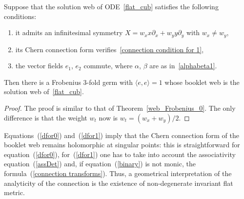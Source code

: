 \documentclass[pdftex]{sigma}
\begin{document}
\begin{theorem}\label{web_Frobenius_1}
Suppose that the solution web of ODE~\eqref{flat_cub} satisfies the following conditions:
\begin{enumerate}\itemsep=0pt
\item[$1)$] it admits an infinitesimal symmetry $X=w_xx\partial_x+w_yy\partial_y$ with $w_x\ne w_y$,
\item[$2)$] its Chern connection form verifies~\eqref{connection condition for 1},
\item[$3)$] the vector fields $e_1$, $e_2$ commute, where $\alpha$, $\beta$ are as in~\eqref{alphabeta1}.
\end{enumerate}
Then there is a Frobenius $3$-fold germ with $\langle e,e\rangle =1$ whose booklet web is the solution web of~\eqref{flat_cub}.
\end{theorem}
\begin{proof} The proof is similar to that of Theorem~\ref{web_Frobenius_0}.
The only dif\/ference is that the weight $w_t$ now is $w_t=(w_x+w_y)/2$.
\end{proof}
\begin{remark}
Equations~(\ref{dfor0}) and~(\ref{dfor1}) imply that the Chern connection form of the booklet web remains holomorphic at singular points: this is straightforward for equation~(\ref{dfor0}), for~(\ref{dfor1}) one has to take into account the associativity equation~(\ref{assDet}) and, if equation~(\ref{binary}) is not monic, the formula~(\ref{connection transforms}). Thus, a geometrical interpretation of the analyticity of the connection is the existence of non-degenerate invariant f\/lat metric.
\end{remark}
\end{document}
